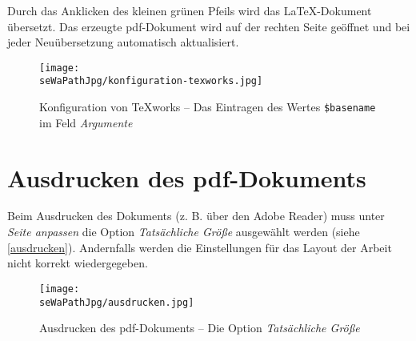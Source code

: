 Durch das Anklicken des kleinen gr\"unen Pfeils wird das \LaTeX-Dokument \"ubersetzt. Das erzeugte 
pdf-Dokument wird auf der rechten Seite ge\"offnet und bei jeder Neu\"ubersetzung automatisch aktualisiert.

\begin{figure}[htbp]
\centering
\texttt{[image: \\seWaPathJpg/konfiguration-texworks.jpg]}
\caption{Konfiguration von TeXworks -- Das Eintragen des Wertes  \texttt{\$basename} im Feld \textsl{Argumente}\label{texworks}}
\end{figure}

\newpage
\section{Ausdrucken des pdf-Dokuments}

Beim Ausdrucken des Dokuments (z. B. \"uber den Adobe Reader) muss unter \textsl{Seite anpassen} 
die Option \textsl{Tats\"achliche Gr\"o{\ss}e} ausgew\"ahlt werden (siehe \vref{ausdrucken}). Andernfalls werden die Einstellungen 
f\"ur das Layout der Arbeit nicht korrekt wiedergegeben. 

\begin{figure}[htbp]
\centering
\texttt{[image: \\seWaPathJpg/ausdrucken.jpg]}
\caption{Ausdrucken des pdf-Dokuments -- Die Option \textsl{Tats\"achliche Gr\"o{\ss}e}\label{ausdrucken}}
\end{figure}




%
%
